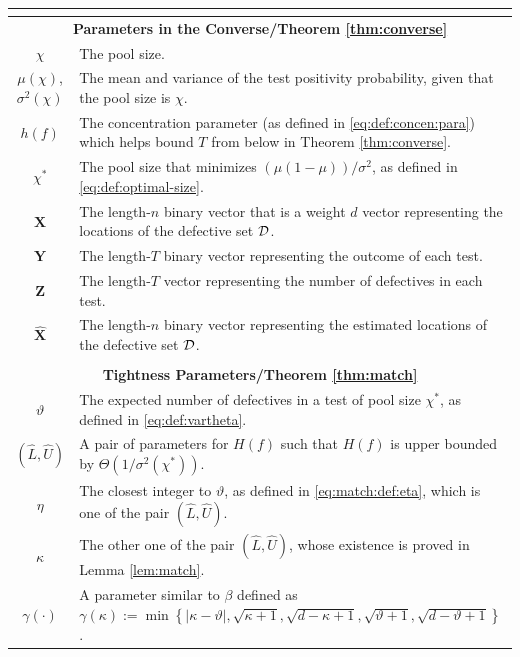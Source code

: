 \documentclass[onecolumn,letterpaper]{IEEEtran}
\newcommand{\cD}{{\cal D}}
\newcommand{\cx}{{X}}
\newcommand{\cy}{{Y}}
\newcommand{\cxh}{{\hat{X}}}
\newcommand{\etp}{{H}}
\newcommand{\mi}{{I}}
\newcommand{\cA}{{Z}}
\newcommand{\plsize}{{\chi}}
\newcommand{\mean}{{\mu}}
\newcommand{\var}{{\sigma^{2}}}
\newcommand{\nan}{{\kappa}}
\newcommand{\apn}{{\gamma}}
\newcommand{\mnp}{{\vartheta}}
\newcommand{\arb}{{\eta}}
\newcommand{\lwm}{{\hat{L}}}
\newcommand{\upm}{{\hat{U}}}
\newcommand{\fh}{{h(f)}}
\newcommand{\fH}{{H(f)}}
\newcommand{\bet}{{\beta}}
\begin{document}
\begin{table}
\begin{tabular}{|c|l|}
        \multicolumn{2}{c}{}
        \\\hline
     \multicolumn{2}{|c|}{{\bf Parameters in the Converse/Theorem \ref{thm:converse}}}
        \\\hline
        $\plsize$ & The pool size. 
        \\\hline
        $\mean(\plsize)$,$\var(\plsize)$ & The mean and variance of the test positivity probability, given that the pool size is $\plsize$.
        \\\hline
        $\fh$ & The concentration parameter (as defined in \eqref{eq:def:concen:para}) which helps bound $T$ from below in Theorem \ref{thm:converse}.
        \\\hline
        $\plsize^*$ & The pool size that minimizes $(\mean(1-\mean))/\var$, as defined in \eqref{eq:def:optimal-size}. 
        \\\hline
        $\boldsymbol{\cx}$ & The length-$n$ binary vector that is a weight $d$ vector representing the locations of the defective set $\cD$.
        \\\hline
        $\boldsymbol{\cy}$ &The length-$T$ binary vector representing the outcome of each test. 
        \\\hline
        $\boldsymbol{\cA}$ &The length-$T$ vector representing the number of defectives in each test. 
        \\\hline
        $\boldsymbol{\cxh}$ & The length-$n$ binary vector representing the estimated locations of the defective set $\cD$. 
        \\\hline
        
        
        \multicolumn{2}{c}{}
        \\\hline
     \multicolumn{2}{|c|}{{\bf Tightness Parameters/Theorem \ref{thm:match}}}
        \\\hline
        $\mnp$ & The expected number of defectives in a test of pool size $\plsize^*$, as defined in \eqref{eq:def:vartheta}.
        \\\hline
        $(\lwm,\upm)$ & A pair of parameters for $\fH$ such that $\fH$ is upper bounded by $\Theta(1/\var(\plsize^*))$.        
        \\\hline
        $\arb$ & The closest integer to $\mnp$, as defined in \eqref{eq:match:def:eta}, which is one of the pair $(\lwm,\upm)$.
        \\\hline
        $\nan$ & The other one of the pair $(\lwm,\upm)$, whose existence is proved in Lemma \ref{lem:match}.
        \\\hline
        $\apn(\cdot)$ & A parameter similar to $\bet$ defined as $\apn(\nan):=\min\left\{ |\nan-\mnp|, \sqrt{\nan+1}, \sqrt{d-\nan+1}, \sqrt{\mnp+1}, \sqrt{d-\mnp+1} \right\}$.
        \\\hline
        

\end{tabular}
\end{table}
\end{document}
